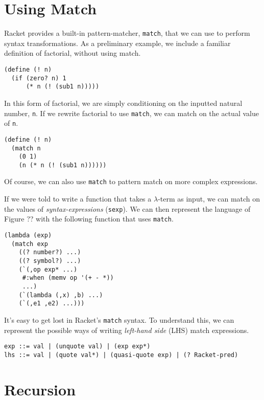 \documentclass[12pt]{book}
\begin{document}
\section{Using Match}

Racket provides a built-in pattern-matcher, {\tt match}, that we can use to
perform syntax transformations. As a preliminary example, we include a
familiar definition of factorial, without using match.
\begin{verbatim}
(define (! n)
  (if (zero? n) 1
      (* n (! (sub1 n)))))
\end{verbatim}
In this form of factorial, we are simply conditioning on the inputted
natural number, {\tt n}. If we rewrite factorial to use {\tt match}, we can
match on the actual value of {\tt n}.
\begin{verbatim}
(define (! n)
  (match n
    (0 1)
    (n (* n (! (sub1 n))))))
\end{verbatim}
Of course, we can also use {\tt match} to pattern match on more complex
expressions.

If we were told to write a function that takes a \(\lambda\)-term as input,
we can match on the values of \textit{syntax-expressions} ({\tt sexp}). We
can then represent the language of Figure ?? with the following function
that uses {\tt match}.
\begin{verbatim}
(lambda (exp)
  (match exp
    ((? number?) ...)
    ((? symbol?) ...)
    (`(,op exp* ...)
     #:when (memv op '(+ - *))
     ...)
    (`(lambda (,x) ,b) ...)
    (`(,e1 ,e2) ...)))
\end{verbatim}
It's easy to get lost in Racket's {\tt match} syntax. To understand this,
we can represent the possible ways of writing \textit{left-hand side} (LHS)
match expressions.
\begin{verbatim}
exp ::= val | (unquote val) | (exp exp*)
lhs ::= val | (quote val*) | (quasi-quote exp) | (? Racket-pred) 
\end{verbatim}

\section{Recursion}
\end{document}
